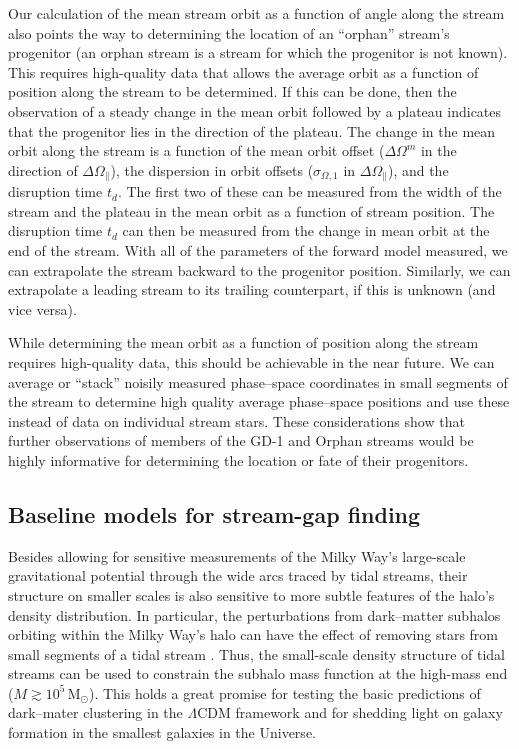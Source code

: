 \documentclass[12pt,preprint]{aastex}
\newcommand{\msun}{\ensuremath{\,\mathrm{M}_{\odot}}}
\newcommand{\opar}{\ensuremath{\Omega_\parallel}}
\begin{document}
Our calculation of the mean stream orbit as a function of angle along
the stream also points the way to determining the location of an
``orphan'' stream's progenitor (an orphan stream is a stream for which
the progenitor is not known). This requires high-quality data that
allows the average orbit as a function of position along the stream to
be determined. If this can be done, then the observation of a steady
change in the mean orbit followed by a plateau indicates that the
progenitor lies in the direction of the plateau. The change in the
mean orbit along the stream is a function of the mean orbit offset
($\Delta \Omega^m$ in the direction of $\Delta \opar$), the dispersion
in orbit offsets ($\sigma_{\Omega,1}$ in $\Delta \opar$), and the
disruption time $t_d$. The first two of these can be measured from the
width of the stream and the plateau in the mean orbit as a function of
stream position. The disruption time $t_d$ can then be measured from
the change in mean orbit at the end of the stream. With all of the
parameters of the forward model measured, we can extrapolate the
stream backward to the progenitor position. Similarly, we can
extrapolate a leading stream to its trailing counterpart, if this is
unknown (and vice versa).

While determining the mean orbit as a function of position along the
stream requires high-quality data, this should be achievable in the
near future. We can average or ``stack'' noisily measured phase--space
coordinates in small segments of the stream to determine high quality
average phase--space positions and use these instead of data on
individual stream stars. These considerations show that further
observations of members of the GD-1 and Orphan streams would be highly
informative for determining the location or fate of their progenitors.

\subsection{Baseline models for stream-gap finding}

Besides allowing for sensitive measurements of the Milky Way's
large-scale gravitational potential through the wide arcs traced by
tidal streams, their structure on smaller scales is also sensitive to
more subtle features of the halo's density distribution. In
particular, the perturbations from dark--matter subhalos orbiting
within the Milky Way's halo can have the effect of removing stars from
small segments of a tidal stream \citep{Yoon11a,Carlberg12a}. Thus,
the small-scale density structure of tidal streams can be used to
constrain the subhalo mass function at the high-mass end ($M \gtrsim
10^5\msun$). This holds a great promise for testing the basic
predictions of dark--mater clustering in the $\Lambda$CDM framework
and for shedding light on galaxy formation in the smallest galaxies in
the Universe.
\end{document}
